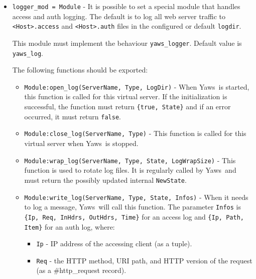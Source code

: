 \documentclass[11pt,oneside,english]{book}
\newcommand{\Yaws}            %
        {{\sc Yaws}}
\begin{document}
\begin{itemize}
\item       \verb+logger_mod = Module+ -
              It is possible to set a special module that handles access and
              auth logging. The default is to log all web server traffic to
              \verb+<Host>.access+ and \verb+<Host>.auth+ files in the
              configured or default \verb+logdir+.

              This module must implement the behaviour
              \verb+yaws_logger+. Default value is \verb+yaws_log+.

              The following functions should be exported:

              \begin{itemize}

              \item \verb+Module:open_log(ServerName, Type, LogDir)+ - When
                \Yaws\ is started, this function is called for this virtual
                server. If the initialization is successful, the function must
                return \verb+{true, State}+ and if an error occurred, it must
                return \verb+false+.

              \item \verb+Module:close_log(ServerName, Type)+ - This function is
                called for this virtual server when \Yaws\ is stopped.

              \item \verb+Module:wrap_log(ServerName, Type, State, LogWrapSize)+
                - This function is used to rotate log files. It is regularly
                called by \Yaws\ and must return the possibly updated internal
                \verb+NewState+.

              \item \verb+Module:write_log(ServerName, Type, State, Infos)+ -
                When it needs to log a message, \Yaws\ will call this
                function. The parameter \verb+Infos+ is
                \verb+{Ip, Req, InHdrs, OutHdrs, Time}+ for an access log and
                \verb+{Ip, Path, Item}+ for an auth log, where:

                        \begin{itemize}

                        \item \verb+Ip+ - IP address of the accessing client (as
                          a tuple).

                        \item \verb+Req+ - the HTTP method, URI path, and HTTP
                          version of the request (as a \#http\_request{}
                          record).


\end{itemize}
\end{itemize}
\end{itemize}
\end{document}
